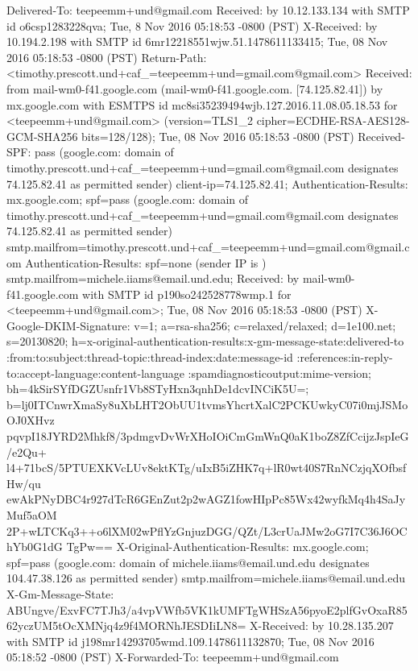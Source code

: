 Delivered-To: teepeemm+und@gmail.com
Received: by 10.12.133.134 with SMTP id o6csp1283228qva;
        Tue, 8 Nov 2016 05:18:53 -0800 (PST)
X-Received: by 10.194.2.198 with SMTP id 6mr12218551wjw.51.1478611133415;
        Tue, 08 Nov 2016 05:18:53 -0800 (PST)
Return-Path: <timothy.prescott.und+caf_=teepeemm+und=gmail.com@gmail.com>
Received: from mail-wm0-f41.google.com (mail-wm0-f41.google.com. [74.125.82.41])
        by mx.google.com with ESMTPS id mc8si35239494wjb.127.2016.11.08.05.18.53
        for <teepeemm+und@gmail.com>
        (version=TLS1_2 cipher=ECDHE-RSA-AES128-GCM-SHA256 bits=128/128);
        Tue, 08 Nov 2016 05:18:53 -0800 (PST)
Received-SPF: pass (google.com: domain of timothy.prescott.und+caf_=teepeemm+und=gmail.com@gmail.com designates 74.125.82.41 as permitted sender) client-ip=74.125.82.41;
Authentication-Results: mx.google.com;
       spf=pass (google.com: domain of timothy.prescott.und+caf_=teepeemm+und=gmail.com@gmail.com designates 74.125.82.41 as permitted sender) smtp.mailfrom=timothy.prescott.und+caf_=teepeemm+und=gmail.com@gmail.com
Authentication-Results: spf=none (sender IP is ) smtp.mailfrom=michele.iiams@email.und.edu;
Received: by mail-wm0-f41.google.com with SMTP id p190so242528778wmp.1
        for <teepeemm+und@gmail.com>; Tue, 08 Nov 2016 05:18:53 -0800 (PST)
X-Google-DKIM-Signature: v=1; a=rsa-sha256; c=relaxed/relaxed;
        d=1e100.net; s=20130820;
        h=x-original-authentication-results:x-gm-message-state:delivered-to
         :from:to:subject:thread-topic:thread-index:date:message-id
         :references:in-reply-to:accept-language:content-language
         :spamdiagnosticoutput:mime-version;
        bh=4kSirSYfDGZUsnfr1Vb8STyHxn3qnhDe1dcvINCiK5U=;
        b=lj0ITCnwrXmaSy8uXbLHT2ObUU1tvmsYhcrtXalC2PCKUwkyC07i0mjJSMoOJ0XHvz
         pqvpI18JYRD2Mhkf8/3pdmgvDvWrXHoIOiCmGmWnQ0aK1boZ8ZfCcijzJspIeG/e2Qu+
         l4+71bcS/5PTUEXKVcLUv8ektKTg/uIxB5iZHK7q+lR0wt40S7RnNCzjqXOfbsfHw/qu
         ewAkPNyDBC4r927dTcR6GEnZut2p2wAGZ1fowHIpPc85Wx42wyfkMq4h4SaJyMuf5aOM
         2P+wLTCKq3++o6lXM02wPflYzGnjuzDGG/QZt/L3crUaJMw2oG7I7C36J6OChYb0G1dG
         TgPw==
X-Original-Authentication-Results: mx.google.com;
       spf=pass (google.com: domain of michele.iiams@email.und.edu designates 104.47.38.126 as permitted sender) smtp.mailfrom=michele.iiams@email.und.edu
X-Gm-Message-State: ABUngve/ExvFC7TJh3/a4vpVWfb5VK1kUMFTgWHSzA56pyoE2plfGvOxaR8562yczUM5tOcXMNjq4z9f4MORNhJESDIiLN8=
X-Received: by 10.28.135.207 with SMTP id j198mr14293705wmd.109.1478611132870;
        Tue, 08 Nov 2016 05:18:52 -0800 (PST)
X-Forwarded-To: teepeemm+und@gmail.com

